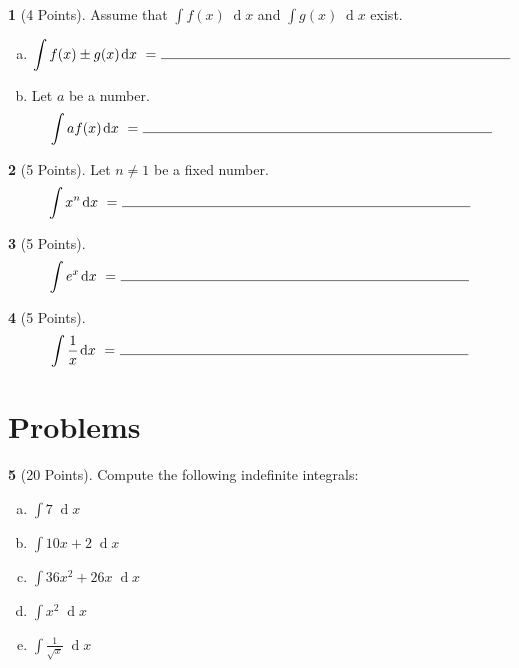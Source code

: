 \documentclass[12pt]{amsart}
\theoremstyle{definition}
\newtheorem{thm}{}
\theoremstyle{definition}
\newcommand{\dx}[1]{\!\!\;\operatorname{d}\!#1}
\begin{document}
\vspace{.15in}

\begin{thm}[4 Points]
  Assume that $\int f(x)\dx{x}$ and $\int g(x)\dx{x}$ exist.
  \begin{enumerate}[(a)]
  \item
    $$\int f(x) \pm g(x) \dx{x}\ =\ \line(1,0){250}$$
  \item
    Let $a$ be a number.
    $$\int af(x)\dx{x}\ =\ \line(1,0){250}$$
  \end{enumerate}
\end{thm}

\vspace{.15in}

\begin{thm}[5 Points]
  Let $n \neq 1$ be a fixed number.
  $$\int x^n \dx{x}\ =\ \line(1,0){250}$$
\end{thm}

\vspace{.15in}

\begin{thm}[5 Points]
  $$\int e^x \dx{x}\ =\ \line(1,0){250}$$
\end{thm}

\vspace{.15in}

\begin{thm}[5 Points]
  $$\int \frac{1}{x}\dx{x}\ =\ \line(1,0){250}$$
\end{thm}

\newpage

\section{Problems}
\setcounter{thm}{0}
\begin{thm}[20 Points]
  Compute the following indefinite integrals:
  \begin{enumerate}[(a)]
  \item
    $\displaystyle{\int 7 \dx{x}}$
    \vspace{1in}
  \item
    $\displaystyle{\int 10x + 2 \dx{x}}$
    \vspace{1in}
  \item
    $\displaystyle{\int 36x^2 + 26x \dx{x}}$
    \vspace{1in}
  \item
    $\displaystyle{\int x^2 \dx{x}}$
    \vspace{1in}
  \item
    $\displaystyle{\int \frac{1}{\sqrt{x}} \dx{x}}$
    \vspace{1in}
  \end{enumerate}
\end{thm}
\end{document}
